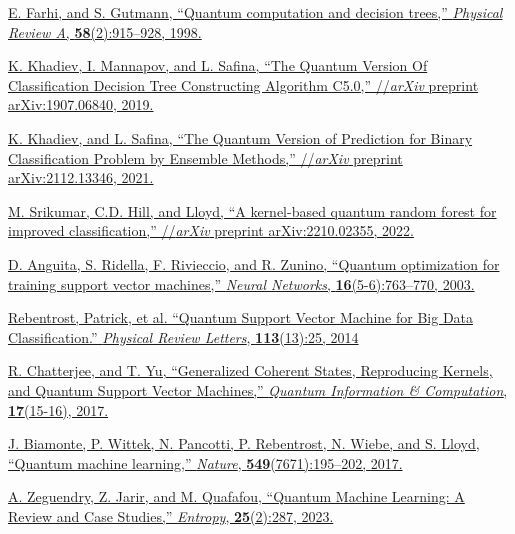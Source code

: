 \documentclass[11pt, oneside]{article}   	%
\begin{document}
\begin{enumerate}[label={[{\arabic*}]}]

    \item \href{https://journals.aps.org/pra/abstract/10.1103/PhysRevA.58.915}{E. Farhi, and S. Gutmann, ``Quantum computation and decision trees,” \textit{Physical Review A}, \textbf{58}(2):915–928, 1998.}
    
    \item \href{https://arxiv.org/abs/1907.06840}{K. Khadiev, I. Mannapov, and L. Safina, ``The Quantum Version Of Classification Decision Tree Constructing Algorithm C5.0,” //\textit{arXiv} preprint arXiv:1907.06840, 2019.}
   
   \item \href{https://arxiv.org/abs/2112.13346}{K. Khadiev, and L. Safina, ``The Quantum Version of Prediction for Binary Classification Problem by Ensemble Methods,” //\textit{arXiv} preprint arXiv:2112.13346, 2021.}
   
   \item \href{https://arxiv.org/abs/2210.02355}{M. Srikumar, C.D. Hill, and Lloyd, ``A kernel-based quantum random forest for improved classification,” //\textit{arXiv} preprint arXiv:2210.02355, 2022.}
   
   \item \href{https://doi.org/10.1016/S0893-6080(03)00087-X}{D. Anguita, S. Ridella, F. Rivieccio, and R. Zunino, ``Quantum optimization for training support vector machines,” \textit{Neural Networks}, \textbf{16}(5-6):763–770, 2003.}
   
   \item \href{https://doi.org/10.1103/PhysRevLett.113.130503}{Rebentrost, Patrick, et al. “Quantum Support Vector Machine for Big Data Classification.” \textit{Physical Review Letters}, \textbf{113}(13):25, 2014}
   
   \item \href{https://doi.org/10.26421/QIC17.15-16}{R. Chatterjee, and T. Yu, ``Generalized Coherent States, Reproducing Kernels, and Quantum Support Vector Machines,” \textit{Quantum Information \& Computation}, \textbf{17}(15-16), 2017.}
   
   \item \href{https://doi.org/10.1038/nature23474}{J. Biamonte, P. Wittek, N. Pancotti, P. Rebentrost, N. Wiebe, and S. Lloyd, ``Quantum machine learning,” \textit{Nature}, \textbf{549}(7671):195–202, 2017.}
   
   \item \href{https://doi.org/10.3390/e25020287}{A. Zeguendry, Z. Jarir, and M. Quafafou, ``Quantum Machine Learning: A Review and Case Studies,” \textit{Entropy}, \textbf{25}(2):287, 2023.}
   

\end{enumerate}
\end{document}

